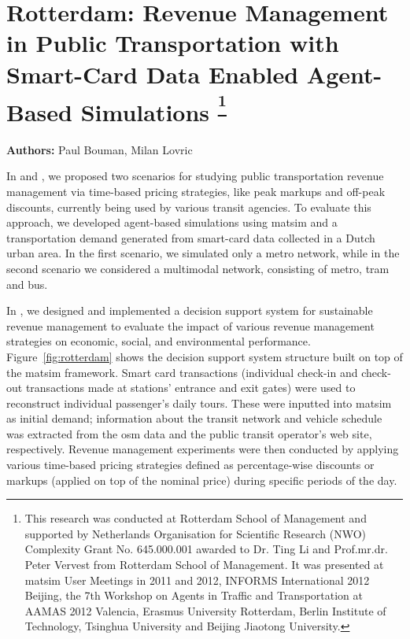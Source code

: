 \section{Rotterdam: Revenue Management in Public Transportation with Smart-Card Data Enabled Agent-Based Simulations \textsuperscript{\footnotesize{\footnote{This research was conducted at Rotterdam School of Management and
supported by Netherlands Organisation for Scientific Research (NWO)
Complexity Grant No. 645.000.001 awarded to Dr. Ting Li and Prof.mr.dr. Peter Vervest from
Rotterdam School of Management. It was presented at \protect\gls{matsim} User Meetings in 2011 and 2012,
INFORMS International 2012 Beijing, the 7th Workshop on Agents in Traffic and Transportation at
AAMAS 2012 Valencia, Erasmus University Rotterdam, Berlin Institute of Technology, Tsinghua
University and Beijing Jiaotong University.}}}}
\label{sec:rotterdam}
\hfill \textbf{Authors:} Paul Bouman, Milan Lovric


In \citet[][]{LovricEtAl_DSS_2013} and \citet[][]{BoumanEtAl_AAMAS_2012}, we proposed two scenarios for studying public transportation revenue management via time-based pricing strategies, like peak markups and off-peak discounts, currently being used by various transit agencies. To evaluate this approach, we developed agent-based simulations using \gls{matsim} and a transportation demand generated from smart-card data collected in a Dutch urban area. In the first scenario, we simulated only a metro network, while in the second scenario we considered a \gls{multimodal} network, consisting of metro, tram and bus.

In \citet[][]{LovricEtAl_DSS_2013}, we designed and implemented a decision support system for sustainable revenue management to evaluate the impact of various revenue management strategies on economic, social, and environmental performance. Figure~\ref{fig:rotterdam} shows the decision support system structure built on top of the \gls{matsim} framework. Smart card transactions (individual check-in and check-out transactions made at stations' entrance and exit gates) were used to reconstruct individual passenger's daily tours. These were inputted into \gls{matsim} as initial demand; information about the transit network and vehicle schedule was extracted from the \gls{osm} data and the public transit operator's web site, respectively. Revenue management experiments were then conducted by applying various time-based pricing strategies defined as percentage-wise discounts or markups (applied on top of the nominal price) during specific periods of the day. 

